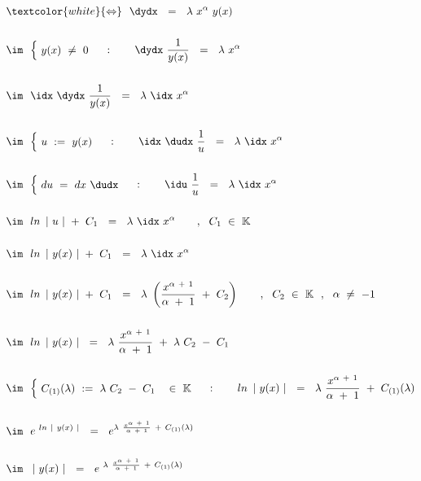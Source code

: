 \begin{enumerate}[leftmargin=*, labelsep=2em, itemsep=3em, label=\alph*)]
	~\\
	
	\setcounter{tc}{0}
	
	$\begin{aligned}[t]
		&\textcolor{white}{\Leftrightarrow} ~~ \dydx ~~ = ~~ \lambda ~ x^{\alpha} ~ y(x) \\ \\
		&\im ~~ {\begin{cases}
			~ y(x) ~ \neq ~ 0 ~
		\end{cases}} : \qquad \dydx ~ \frac{1}{y(x)} ~~ = ~~ \lambda ~ x^{\alpha} \\ \\
		&\im ~~ \idx ~ \dydx ~ \frac{1}{y(x)} ~~ = ~~ \lambda ~ \idx ~ x^{\alpha} \\ \\
		&\im ~~ {\begin{cases}
			~ u ~ := ~ y(x) ~
			\end{cases}} : \qquad \idx ~ \dudx ~ \frac{1}{u} ~~ = ~~ \lambda ~ \idx ~ x^{\alpha} \\ \\
		&\im ~~ {\begin{cases}
			~ du ~ = ~ dx ~ \dudx ~
			\end{cases}} : \qquad \idu ~ \frac{1}{u} ~~ = ~~ \lambda ~ \idx ~ x^{\alpha} \\ \\
		&\im ~~ ln ~ \left| ~ u ~ \right| ~ + ~ C_1 ~~ = ~~ \lambda ~ \idx ~ x^{\alpha} \qquad, ~~ C_1 ~ \in ~ \mathbb{K} \\ \\
		&\im ~~ ln ~ \left| ~ y(x) ~ \right| ~ + ~ C_1 ~~ = ~~ \lambda ~ \idx ~ x^{\alpha} \\ \\
		&\im ~~ ln ~ \left| ~ y(x) ~ \right| ~ + ~ C_1 ~~ = ~~ \lambda ~ \left( \frac{x^{\alpha ~ + ~ 1}}{\alpha ~ + ~ 1} ~ + ~ C_2 \right) \qquad, ~~ C_2 ~ \in ~ \mathbb{K} ~~, ~~ \alpha ~ \neq ~ -1 \\ \\
		&\im ~~ ln ~ \left| ~ y(x) ~ \right| ~~ = ~~ \lambda ~ \frac{x^{\alpha ~ + ~ 1}}{\alpha ~ + ~ 1} ~ + ~ \lambda ~ C_2 ~ - ~ C_1 \\ \\
		&\im ~~ {\begin{cases}
			~ C_{(1)}(\lambda) ~ := ~ \lambda ~ C_2 ~ - ~ C_1 ~~ ~ \in ~ \mathbb{K} ~
		\end{cases}} : \qquad ln ~ \left| ~ y(x) ~ \right| ~~ = ~~ \lambda ~ \frac{x^{\alpha ~ + ~ 1}}{\alpha ~ + ~ 1} ~ + ~ C_{(1)}(\lambda) \\ \\
		&\im ~~ e^{~ ln ~ \left| ~ y(x) ~ \right|} ~~ = ~~ e^{\lambda ~ \frac{x^{\alpha ~ + ~ 1}}{\alpha ~ + ~ 1} ~ + ~ C_{(1)}(\lambda) } \\ \\
		&\im ~~ \left| ~ y(x) ~ \right| ~~ = ~~ e^{~ \lambda ~ \frac{x^{\alpha ~ + ~ 1}}{\alpha ~ + ~ 1} ~ + ~ C_{(1)}(\lambda) }
	\end{aligned}$
	

\end{enumerate}
